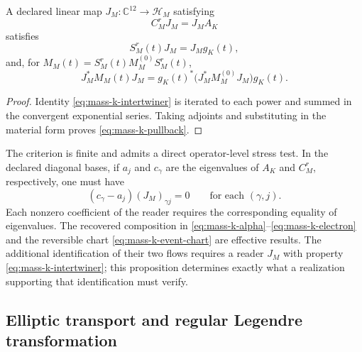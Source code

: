 \begin{proposition}
A declared linear map
\(J_M:\mathbb C^{12}\to\mathscr H_M\) satisfying
\begin{equation}
 C_M^rJ_M=J_MA_K
 \label{eq:mass-k-intertwiner}
\end{equation}
satisfies
\[
 S_M^r(t)J_M=J_Mg_K(t),
\]
and, for \(M_M(t)=S_M^r(t)M_M^{(0)}S_M^r(t)\),
\begin{equation}
 J_M^*M_M(t)J_M
 =g_K(t)^*\bigl(J_M^*M_M^{(0)}J_M\bigr)g_K(t).
 \label{eq:mass-k-pullback}
\end{equation}
\end{proposition}
\begin{proof}
Identity \eqref{eq:mass-k-intertwiner} is iterated to each power
and summed in the convergent exponential series. Taking adjoints and
substituting in the material form proves
\eqref{eq:mass-k-pullback}.
\end{proof}

The criterion is finite and admits a direct operator-level
stress test. In the declared diagonal bases, if \(a_j\) and
\(c_\gamma\) are the eigenvalues of \(A_K\) and \(C_M^r\),
respectively, one must have
\[
 (c_\gamma-a_j)(J_M)_{\gamma j}=0
 \qquad\text{for each }(\gamma,j).
\]
Each nonzero coefficient of the reader requires the corresponding equality
of eigenvalues. The recovered composition in
\eqref{eq:mass-k-alpha}--\eqref{eq:mass-k-electron} and the reversible chart
\eqref{eq:mass-k-event-chart} are effective results. The additional
identification of their two flows requires a reader \(J_M\) with property
\eqref{eq:mass-k-intertwiner}; this proposition determines exactly
what a realization supporting that identification must verify.

\subsection{Elliptic transport and regular Legendre transformation}

